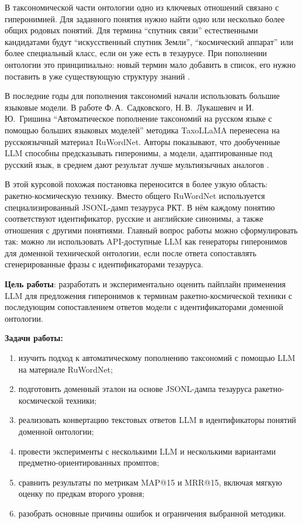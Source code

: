 \documentclass[12pt,a4paper,oneside,openany]{report}
\begin{document}
В таксономической части онтологии одно из ключевых отношений связано с гиперонимией. Для заданного понятия нужно найти одно или несколько более общих родовых понятий. Для термина ``спутник связи'' естественными кандидатами будут ``искусственный спутник Земли'', ``космический аппарат'' или более специальный класс, если он уже есть в тезаурусе. При пополнении онтологии это принципиально: новый термин мало добавить в список, его нужно поставить в уже существующую структуру знаний \cite{gruber1993,hearst1992}.

В последние годы для пополнения таксономий начали использовать большие языковые модели. В работе Ф.\,А.~Садковского, Н.\,В.~Лукашевич и И.\,Ю.~Гришина ``Автоматическое пополнение таксономий на русском языке с помощью больших языковых моделей'' методика TaxoLLaMA перенесена на русскоязычный материал RuWordNet. Авторы показывают, что дообученные LLM способны предсказывать гиперонимы, а модели, адаптированные под русский язык, в среднем дают результат лучше мультиязычных аналогов \cite{rcai2025,taxollama,ruwordnet}.

В этой курсовой похожая постановка переносится в более узкую область: ракетно-космическую технику. Вместо общего RuWordNet используется специализированный JSONL-дамп тезауруса РКТ. В нём каждому понятию соответствуют идентификатор, русские и английские синонимы, а также отношения с другими понятиями. Главный вопрос работы можно сформулировать так: можно ли использовать API-доступные LLM как генераторы гиперонимов для доменной технической онтологии, если после ответа сопоставлять сгенерированные фразы с идентификаторами тезауруса.

\textbf{Цель работы}: разработать и экспериментально оценить пайплайн применения LLM для предложения гиперонимов к терминам ракетно-космической техники с последующим сопоставлением ответов модели с идентификаторами доменной онтологии.

\textbf{Задачи работы:}
\begin{enumerate}
  \item изучить подход к автоматическому пополнению таксономий с помощью LLM на материале RuWordNet;
  \item подготовить доменный эталон на основе JSONL-дампа тезауруса ракетно-космической техники;
  \item реализовать конвертацию текстовых ответов LLM в идентификаторы понятий доменной онтологии;
  \item провести эксперименты с несколькими LLM и несколькими вариантами предметно-ориентированных промптов;
  \item сравнить результаты по метрикам MAP@15 и MRR@15, включая мягкую оценку по предкам второго уровня;
  \item разобрать основные причины ошибок и ограничения выбранной методики.
\end{enumerate}
\end{document}
